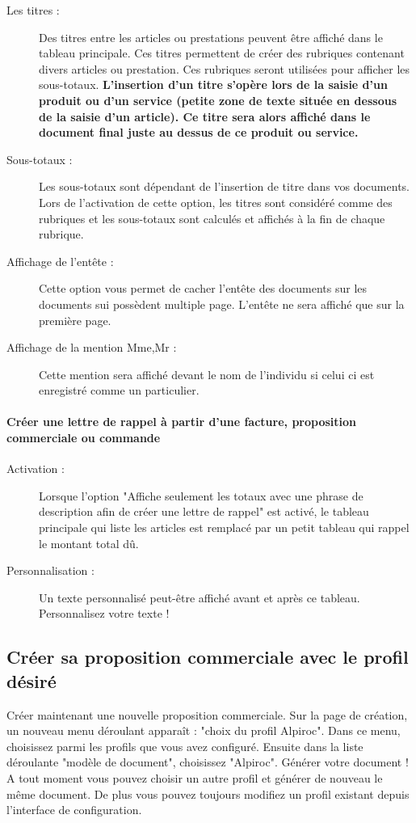 \documentclass[a4paper,11pt]{article}
\begin{document}
\begin{description}
  \item[Les titres :] Des titres entre les articles ou prestations peuvent être affiché dans le tableau principale. Ces titres permettent de créer des rubriques contenant divers articles ou prestation. Ces rubriques seront utilisées pour afficher les sous-totaux. \textbf{L'insertion d'un titre s'opère lors de la saisie d'un produit ou d'un service (petite zone de texte située en dessous de la saisie d'un article). Ce titre sera alors affiché dans le document final juste au dessus de ce produit ou service.}
  \item[Sous-totaux :] Les sous-totaux sont dépendant de l'insertion de titre dans vos documents. Lors de l'activation de cette option, les titres sont considéré comme des rubriques et les sous-totaux sont calculés et affichés à la fin de chaque rubrique.
  \item[Affichage de l'entête : ] Cette option vous permet de cacher l'entête des documents sur les documents sui possèdent multiple page. L'entête ne sera affiché que sur la première page.
  \item[Affichage de la mention Mme,Mr :] Cette mention sera affiché devant le nom de l'individu si celui ci est enregistré comme un particulier.
\end{description}

\paragraph{Créer une lettre de rappel à partir d'une facture, proposition commerciale ou commande}
\begin{description}
  \item[Activation :] Lorsque l'option "Affiche seulement les totaux avec une phrase de description afin de créer une lettre de rappel" est activé, le tableau principale qui liste les articles est remplacé par un petit tableau qui rappel le montant total dû.
  \item[Personnalisation :] Un texte personnalisé peut-être affiché avant et après ce tableau. Personnalisez votre texte !
\end{description}

\subsection{Créer sa proposition commerciale avec le profil désiré}
Créer maintenant une nouvelle proposition commerciale. Sur la page de création, un nouveau menu déroulant apparaît : "choix du profil Alpiroc". Dans ce menu, choisissez parmi les profils que vous avez configuré. Ensuite dans la liste déroulante "modèle de document", choisissez "Alpiroc". Générer votre document ! A tout moment vous pouvez choisir un autre profil et générer de nouveau le même document. De plus vous pouvez toujours modifiez un profil existant depuis l'interface de configuration.
\end{document}
